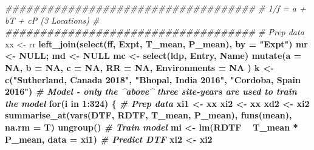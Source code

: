 \documentclass[
]{article}
\newenvironment{Shaded}{\begin{snugshade}}{\end{snugshade}}
\newcommand{\CommentTok}[1]{\textcolor[rgb]{0.56,0.35,0.01}{\textit{#1}}}
\newcommand{\ControlFlowTok}[1]{\textcolor[rgb]{0.13,0.29,0.53}{\textbf{#1}}}
\newcommand{\DataTypeTok}[1]{\textcolor[rgb]{0.13,0.29,0.53}{#1}}
\newcommand{\DecValTok}[1]{\textcolor[rgb]{0.00,0.00,0.81}{#1}}
\newcommand{\KeywordTok}[1]{\textcolor[rgb]{0.13,0.29,0.53}{\textbf{#1}}}
\newcommand{\NormalTok}[1]{#1}
\newcommand{\OperatorTok}[1]{\textcolor[rgb]{0.81,0.36,0.00}{\textbf{#1}}}
\newcommand{\OtherTok}[1]{\textcolor[rgb]{0.56,0.35,0.01}{#1}}
\newcommand{\StringTok}[1]{\textcolor[rgb]{0.31,0.60,0.02}{#1}}
\begin{document}
\begin{Shaded}
\begin{Highlighting}[]
\CommentTok{####################################}
\CommentTok{# 1/f = a + bT + cP (3 Locations)  #}
\CommentTok{####################################}
\CommentTok{# Prep data}
\NormalTok{xx <-}\StringTok{ }\NormalTok{rr }\OperatorTok{%
\StringTok{  }\KeywordTok{left_join}\NormalTok{(}\KeywordTok{select}\NormalTok{(ff, Expt, T_mean, P_mean), }\DataTypeTok{by =} \StringTok{"Expt"}\NormalTok{)}
\NormalTok{mr <-}\StringTok{ }\OtherTok{NULL}\NormalTok{; md <-}\StringTok{ }\OtherTok{NULL}
\NormalTok{mc <-}\StringTok{ }\KeywordTok{select}\NormalTok{(ldp, Entry, Name) }\OperatorTok{%
\StringTok{  }\KeywordTok{mutate}\NormalTok{(}\DataTypeTok{a =} \OtherTok{NA}\NormalTok{, }\DataTypeTok{b =} \OtherTok{NA}\NormalTok{, }\DataTypeTok{c =} \OtherTok{NA}\NormalTok{, }\DataTypeTok{RR =} \OtherTok{NA}\NormalTok{, }\DataTypeTok{Environments =} \OtherTok{NA}\NormalTok{ )}
\NormalTok{k <-}\StringTok{ }\KeywordTok{c}\NormalTok{(}\StringTok{"Sutherland, Canada 2018"}\NormalTok{, }\StringTok{"Bhopal, India 2016"}\NormalTok{, }\StringTok{"Cordoba, Spain 2016"}\NormalTok{)}
\CommentTok{# Model - only the ^above^ three site-years are used to train the model}
\ControlFlowTok{for}\NormalTok{(i }\ControlFlowTok{in} \DecValTok{1}\OperatorTok{:}\DecValTok{324}\NormalTok{) \{}
  \CommentTok{# Prep data}
\NormalTok{  xi1 <-}\StringTok{ }\NormalTok{xx }\OperatorTok{%
\NormalTok{  xi2 <-}\StringTok{ }\NormalTok{xx }\OperatorTok{%
\NormalTok{  xd2 <-}\StringTok{ }\NormalTok{xi2 }\OperatorTok{%
\StringTok{    }\KeywordTok{summarise_at}\NormalTok{(}\KeywordTok{vars}\NormalTok{(DTF, RDTF, T_mean, P_mean), }\KeywordTok{funs}\NormalTok{(mean), }\DataTypeTok{na.rm =}\NormalTok{ T) }\OperatorTok{%
\StringTok{    }\KeywordTok{ungroup}\NormalTok{()}
  \CommentTok{# Train model}
\NormalTok{  mi <-}\StringTok{ }\KeywordTok{lm}\NormalTok{(RDTF }\OperatorTok{~}\StringTok{ }\NormalTok{T_mean }\OperatorTok{*}\StringTok{ }\NormalTok{P_mean, }\DataTypeTok{data =}\NormalTok{ xi1)}
  \CommentTok{# Predict DTF}
\NormalTok{  xi2 <-}\StringTok{ }\NormalTok{xi2 }\OperatorTok{%
}}}}}}}
\end{Highlighting}
\end{Shaded}
\end{document}
